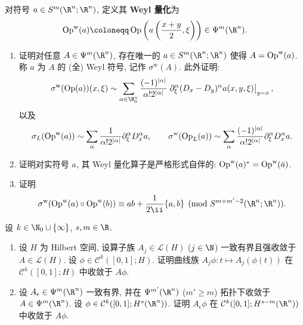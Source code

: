 \begin{exer}[Weyl 量化]\label{ex:4.7}
对符号 $a \in S^m(\R^n; \R^n)$, 定义其 \textbf{Weyl 量化}为
\begin{equation}\label{eq:4.163}
    \Op^{\mathrm{w}}(a) \defeq \Op\left( a\left( \frac{x+y}{2}, \xi \right) \right) \in \Psi^m(\R^n).
\end{equation}
\begin{enumerate}
    \item 证明对任意 $A \in \Psi^m(\R^n)$, 存在唯一的 $a \in S^m(\R^n; \R^n)$ 使得 $A = \operatorname{Op}^{\mathrm{w}}(a)$. 称 $a$ 为 $A$ 的 (全) Weyl 符号, 记作 $\sigma^{\mathrm{w}}(A)$. 此外证明:
    \begin{equation}\label{eq:4.164}
        \sigma^{\mathrm{w}}(\Op(a))(x, \xi) \sim \sum_{\alpha \in \N_0^n} \frac{(-1)^{|\alpha|}}{\alpha! 2^{|\alpha|}} \left. \partial_\xi^\alpha (D_x - D_y)^\alpha a(x, y, \xi) \right|_{y = x},
    \end{equation}
    以及
    \begin{equation}\label{eq:4.165}
        \sigma_L(\operatorname{Op}^{\mathrm{w}}(a)) \sim \sum_\alpha \frac{1}{\alpha! 2^{|\alpha|}} \partial_\xi^\alpha D_x^\alpha a, \qquad \sigma^{\mathrm{w}}(\operatorname{Op}_L(a)) \sim \sum_\alpha \frac{(-1)^{|\alpha|}}{\alpha! 2^{|\alpha|}} \partial_\xi^\alpha D_x^\alpha a.
    \end{equation}
    \item 证明对实符号 $a$, 其 Weyl 量化算子是严格形式自伴的: $\operatorname{Op}^{\mathrm{w}}(a)^* = \operatorname{Op}^{\mathrm{w}}(\bar{a})$.
    \item 证明
    \begin{equation}\label{eq:4.166}
        \sigma^{\mathrm{w}}(\Op^{\mathrm{w}}(a) \circ \Op^{\mathrm{w}}(b)) \equiv a b + \frac{1}{2\ii} \{a, b\} \pmod{S^{m+m'-2}(\R^n; \R^n)}.
    \end{equation}
\end{enumerate}
\end{exer}

\begin{exer}[算子族中的强收敛性]\label{ex:4.8}
设 $k \in \N_0 \cup \{\infty\}$, $s, m \in \R$.
\begin{enumerate}
    \item 设 $H$ 为 Hilbert 空间, 设算子族 $A_j \in \mathcal{L}(H)$ ($j \in \N$) 一致有界且强收敛于 $A \in \mathcal{L}(H)$. 设 $\phi \in \mathcal{C}^k([0, 1]; H)$. 证明曲线族 $A_j \phi \colon t \mapsto A_j(\phi(t))$ 在 $\mathcal{C}^k([0, 1]; H)$ 中收敛于 $A \phi$.
    \item 设 $A_\epsilon \in \Psi^m(\R^n)$ 一致有界, 并在 $\Psi^{m'}(\R^n)$ ($m' \ge m$) 拓扑下收敛于 $A \in \Psi^m(\R^n)$. 设 $\phi \in \mathcal{C}^k([0, 1]; H^s(\R^n))$. 证明 $A_\epsilon \phi$ 在 $\mathcal{C}^k([0, 1]; H^{s-m}(\R^n))$ 中收敛于 $A \phi$.
\end{enumerate}
\end{exer}

